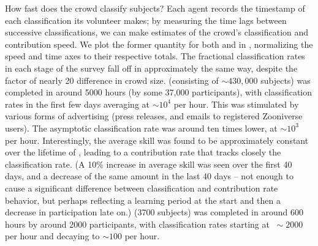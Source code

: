 \documentclass[useAMS,usenatbib,a4paper]{mn2e}
\begin{document}
How fast does the \SW crowd classify subjects? Each agent records the timestamp
of each classification its volunteer makes; by measuring the time lags between
successive classifications, we can make estimates of the crowd's classification
and contribution speed. We plot the former quantity for both \StageOne and
\StageTwo in , normalizing the speed and time axes to
their respective totals. The fractional classification rates
in each stage of the survey fall off in approximately the same way, despite the
factor of nearly 20 difference in crowd size. \StageOne (consisting of
$\sim430,000$ subjects) was completed in around 5000 hours (by some 37,000
participants), with classification rates in the first few days averaging at
$\sim10^4$ per hour. This was stimulated by various forms of advertising (press
releases, and emails to registered Zooniverse users). The asymptotic
classification rate was  around ten times lower, at $\sim10^3$ per hour.
Interestingly, the average skill was found to be approximately constant over the
lifetime of \StageOne, leading to a contribution rate that tracks closely the
classification rate. (A 10\% increase in average skill was seen over the first
40 days, and a decrease of the same amount in the last 40 days -- not enough to
cause a significant difference between classification and contribution rate
behavior, but perhaps reflecting a learning period at the start and then a
decrease
in participation late on.) \StageTwo (3700 subjects) was completed in around 600
hours by around 2000 participants, with classification rates starting at
$~\sim2000$ per hour and decaying to $\sim100$ per hour.
\end{document}
